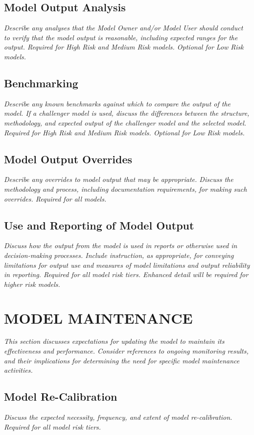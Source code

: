 \documentclass[12pt,letterpaper]{article}
\begin{document}
\subsection{Model Output Analysis}
\textit{Describe any analyses that the Model Owner and/or Model User should conduct to verify that the model output is reasonable, including expected ranges for the output. Required for High Risk and Medium Risk models. Optional for Low Risk models.}

\subsection{Benchmarking}
\textit{Describe any known benchmarks against which to compare the output of the model. If a challenger model is used, discuss the differences between the structure, methodology, and expected output of the challenger model and the selected model. Required for High Risk and Medium Risk models. Optional for Low Risk models.}

\subsection{Model Output Overrides}
\textit{Describe any overrides to model output that may be appropriate. Discuss the methodology and process, including documentation requirements, for making such overrides. Required for all models.}

\subsection{Use and Reporting of Model Output}
\textit{Discuss how the output from the model is used in reports or otherwise used in decision-making processes. Include instruction, as appropriate, for conveying limitations for output use and measures of model limitations and output reliability in reporting. Required for all model risk tiers. Enhanced detail will be required for higher risk models.}

\section{MODEL MAINTENANCE}
\textit{This section discusses expectations for updating the model to maintain its effectiveness and performance. Consider references to ongoing monitoring results, and their implications for determining the need for specific model maintenance activities.}

\subsection{Model Re-Calibration}
\textit{Discuss the expected necessity, frequency, and extent of model re-calibration. Required for all model risk tiers.}
\end{document}
